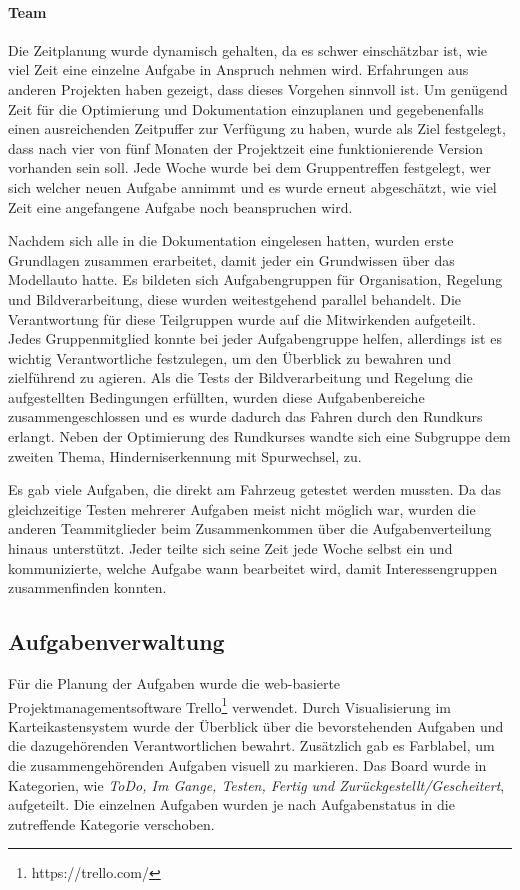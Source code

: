 \paragraph{Team}

Die Zeitplanung wurde dynamisch gehalten, da es schwer einschätzbar ist, wie viel Zeit eine einzelne Aufgabe in Anspruch nehmen wird. Erfahrungen aus anderen Projekten haben gezeigt, dass dieses Vorgehen sinnvoll ist. Um genügend Zeit für die Optimierung und Dokumentation einzuplanen und gegebenenfalls einen ausreichenden Zeitpuffer zur Verfügung zu haben, wurde als Ziel festgelegt, dass nach vier von fünf Monaten der Projektzeit eine funktionierende Version vorhanden sein soll. Jede Woche wurde bei dem Gruppentreffen festgelegt, wer sich welcher neuen Aufgabe annimmt und es wurde erneut abgeschätzt, wie viel Zeit eine angefangene Aufgabe noch beanspruchen wird.


Nachdem sich alle in die Dokumentation eingelesen hatten, wurden erste Grundlagen zusammen erarbeitet, damit jeder ein Grundwissen über das Modellauto hatte. Es bildeten sich Aufgabengruppen für Organisation, Regelung und Bildverarbeitung, diese wurden weitestgehend parallel behandelt. Die Verantwortung für diese Teilgruppen wurde auf die Mitwirkenden aufgeteilt. Jedes Gruppenmitglied konnte bei jeder Aufgabengruppe helfen, allerdings ist es wichtig Verantwortliche festzulegen, um den Überblick zu bewahren und zielführend zu agieren. Als die Tests der Bildverarbeitung und Regelung die aufgestellten Bedingungen erfüllten, wurden diese Aufgabenbereiche zusammengeschlossen und es wurde dadurch das Fahren durch den Rundkurs erlangt. Neben der Optimierung des Rundkurses wandte sich eine Subgruppe dem zweiten Thema, Hinderniserkennung mit Spurwechsel, zu.

Es gab viele Aufgaben, die direkt am Fahrzeug getestet werden mussten. Da das gleichzeitige Testen mehrerer Aufgaben meist nicht möglich war, wurden die anderen Teammitglieder beim Zusammenkommen über die Aufgabenverteilung hinaus unterstützt. Jeder teilte sich seine Zeit jede Woche selbst ein und kommunizierte, welche Aufgabe wann bearbeitet wird, damit Interessengruppen zusammenfinden konnten. 


\subsection{Aufgabenverwaltung}
\label{sec:aufgabenverwaltung}
Für die Planung der Aufgaben wurde die web-basierte Projektmanagementsoftware Trello\footnote{https://trello.com/} verwendet. Durch Visualisierung im Karteikastensystem wurde der Überblick über die bevorstehenden Aufgaben und die dazugehörenden Verantwortlichen bewahrt. Zusätzlich gab es Farblabel, um die zusammengehörenden Aufgaben visuell zu markieren. Das Board wurde in Kategorien, wie \textit{ToDo, Im Gange, Testen, Fertig und Zurückgestellt/Gescheitert}, aufgeteilt. Die einzelnen Aufgaben wurden je nach Aufgabenstatus in die zutreffende Kategorie verschoben. 

